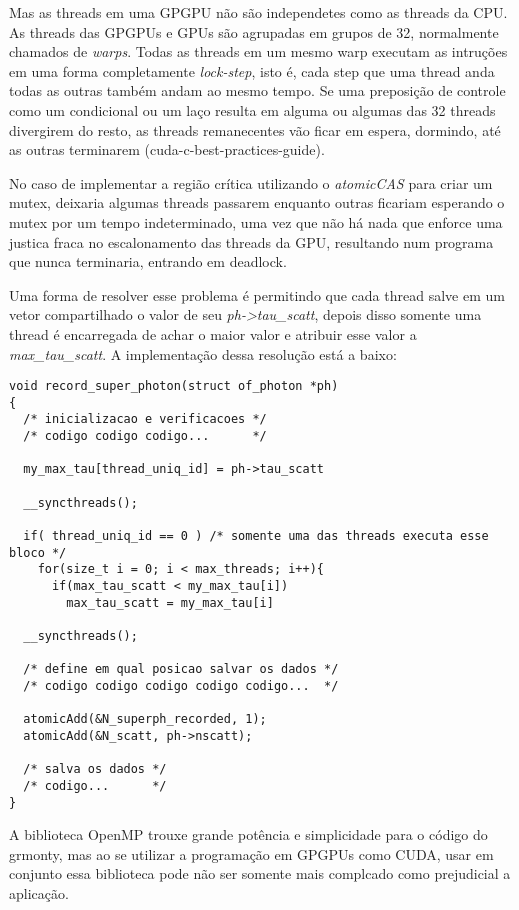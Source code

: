     Mas as threads em uma GPGPU não são independetes como as threads da CPU. As threads das GPGPUs e GPUs são agrupadas em grupos de 32, normalmente chamados de \textit{warps}. Todas as threads em um mesmo warp executam as intruções em uma forma completamente \textit{lock-step}, isto é, cada step que uma thread anda todas as outras também andam ao mesmo tempo. Se uma preposição de controle como um condicional ou um laço resulta em alguma ou algumas das 32 threads divergirem do resto, as threads remanecentes vão ficar em espera, dormindo, até as outras terminarem (cuda-c-best-practices-guide).

    No caso de implementar a região crítica utilizando o \textit{atomicCAS} para criar um mutex, deixaria algumas threads passarem enquanto outras ficariam esperando o mutex por um tempo indeterminado, uma vez que não há nada que enforce uma justica fraca no escalonamento das threads da GPU, resultando num programa que nunca terminaria, entrando em deadlock.

    Uma forma de resolver esse problema é permitindo que cada thread salve em um vetor compartilhado o valor de seu \textit{ph->tau\_scatt}, depois disso somente uma thread é encarregada de achar o maior valor e atribuir esse valor a \textit{max\_tau\_scatt}. A implementação dessa resolução está a baixo:

    \begin{lstlisting}
void record_super_photon(struct of_photon *ph)
{
  /* inicializacao e verificacoes */
  /* codigo codigo codigo...      */

  my_max_tau[thread_uniq_id] = ph->tau_scatt

  __syncthreads();

  if( thread_uniq_id == 0 ) /* somente uma das threads executa esse bloco */
    for(size_t i = 0; i < max_threads; i++){
      if(max_tau_scatt < my_max_tau[i])
        max_tau_scatt = my_max_tau[i]

  __syncthreads();

  /* define em qual posicao salvar os dados */
  /* codigo codigo codigo codigo codigo...  */

  atomicAdd(&N_superph_recorded, 1);
  atomicAdd(&N_scatt, ph->nscatt);

  /* salva os dados */
  /* codigo...      */
}
    \end{lstlisting}

    A biblioteca OpenMP trouxe grande potência e simplicidade para o código do grmonty, mas ao se utilizar a programação em GPGPUs como CUDA, usar em conjunto essa biblioteca pode não ser somente mais complcado como prejudicial a aplicação.

